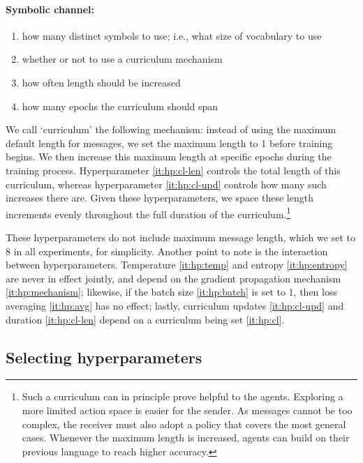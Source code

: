 \documentclass[twocolumn]{article}
\begin{document}
\paragraph{Symbolic channel:}
\begin{enumerate}[resume*]
    \vspace*{-0.5em}
    \itemsep-0.25em 
    \item how many distinct symbols to use; i.e., what size of vocabulary to use
    \item \label{it:hp:cl} whether or not to use a curriculum mechanism
    \item \label{it:hp:cl-upd} how often length should be increased
    \item \label{it:hp:cl-len} how many epochs the curriculum should span
\end{enumerate}

We call `curriculum' the following mechanism: instead of using the maximum default length for messages, we set the maximum length to 1 before training begins.
We then increase this maximum length at specific epochs during the training process.
Hyperparameter \ref{it:hp:cl-len} controls the total length of this curriculum, whereas hyperparameter \ref{it:hp:cl-upd} controls how many such increases there are.
Given these hyperparameters, we space these length increments evenly throughout the full duration of the curriculum.\footnote{
    Such a curriculum can in principle prove helpful to the agents.
    Exploring a more limited action space is easier for the sender.
    As messages cannot be too complex, the receiver must also adopt a policy that covers the most general cases.
    Whenever the maximum length is increased, agents can build on their previous language to reach higher accuracy.
}

These hyperparameters do not include maximum message length, which we set to 8 in all experiments, for simplicity.
Another point to note is the interaction between hyperparameters.
Temperature \ref{it:hp:temp} and entropy \ref{it:hp:entropy} are never in effect jointly, and depend on the gradient propagation mechanism \ref{it:hp:mechanism}; likewise, if the batch size \ref{it:hp:batch} is set to 1, then loss averaging \ref{it:hp:avg} has no effect; lastly, curriculum updates \ref{it:hp:cl-upd} and duration \ref{it:hp:cl-len} depend on a curriculum being set \ref{it:hp:cl}.

\subsection{Selecting hyperparameters} \label{sec:experiment:bayes-opt}
\end{document}

